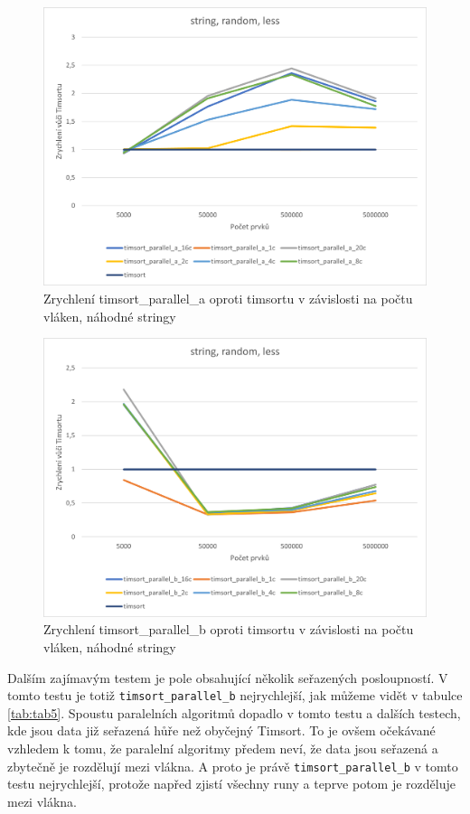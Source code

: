 \documentclass[thesis=B,czech]{FITthesis}[2019/12/23]
\begin{document}
\begin{figure}[htbp]\centering
	\includegraphics[width=13cm]{obrazky/graf26.png}
	\caption[Zrychlení timsort\_parallel\_a oproti timsortu v závislosti na počtu vláken, náhodné stringy]{Zrychlení timsort\_parallel\_a oproti timsortu v závislosti na počtu vláken, náhodné stringy}\label{fig:graf26}
\end{figure}
\begin{figure}[htbp]\centering
	\includegraphics[width=13cm]{obrazky/graf27.png}
	\caption[Zrychlení timsort\_parallel\_b oproti timsortu v závislosti na počtu vláken, náhodné stringy]{Zrychlení timsort\_parallel\_b oproti timsortu v závislosti na počtu vláken, náhodné stringy}\label{fig:graf27}
\end{figure}


Dalším zajímavým testem je pole obsahující několik seřazených posloupností. V tomto testu je totiž \texttt{timsort\_parallel\_b} nejrychlejší, jak můžeme vidět v tabulce \ref{tab:tab5}. Spoustu paralelních algoritmů dopadlo v tomto testu a dalších testech, kde jsou data již seřazená hůře než obyčejný Timsort. To je ovšem očekávané vzhledem k tomu, že paralelní algoritmy předem neví, že data jsou seřazená a zbytečně je rozdělují mezi vlákna. A proto je právě \texttt{timsort\_parallel\_b} v tomto testu nejrychlejší, protože napřed zjistí všechny runy a teprve potom je rozděluje mezi vlákna.
\end{document}
